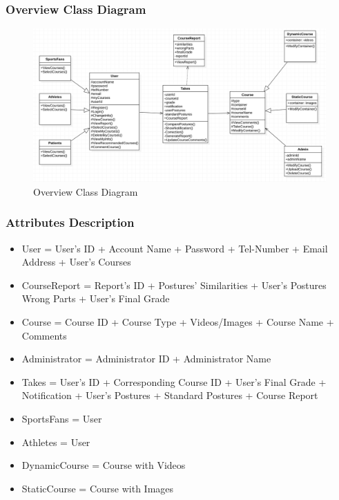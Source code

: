 \documentclass[16pt]{scrreprt}
\begin{document}
\subsubsection{Overview Class Diagram}
\begin{figure}[H]
\centering
\includegraphics[width=1.1\textwidth]{figures/classDiagram.png}
\caption{Overview Class Diagram}
\label{fig:classdia}

\end{figure}
\subsubsection{Attributes Description}
\begin{itemize}
	\item User = User's ID + Account Name + Password + Tel-Number + Email Address + User's Courses
	\item CourseReport = Report's ID + Postures' Similarities + User's Postures Wrong Parts + User's Final Grade
	\item Course = Course ID + Course Type + Videos/Images + Course Name + Comments
	\item Administrator = Administrator ID + Administrator Name
	\item Takes = User's ID + Corresponding Course ID + User's Final Grade + Notification + User's Postures + Standard Postures + Course Report
	\item SportsFans = User
	\item Athletes  = User
	\item DynamicCourse = Course with Videos
	\item StaticCourse = Course with Images
\end{itemize}
\end{document}
